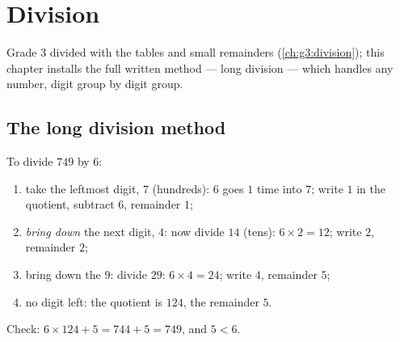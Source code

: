 \chapter{Division}\label{ch:g4:division}

Grade 3 divided with the tables and small remainders
(\cref{ch:g3:division}); this chapter installs the full written
method --- long division --- which handles any number, digit group by
digit group.

\section{The long division method}

\begin{method}\label{met:g4:division:method}
To divide $749$ by $6$:
\begin{enumerate}
  \item take the leftmost digit, $7$ (hundreds): $6$ goes $1$ time
        into $7$; write $1$ in the quotient, subtract
        $6$, remainder $1$;
  \item \emph{bring down} the next digit, $4$: now divide $14$
        (tens): $6 \times 2 = 12$; write $2$, remainder $2$;
  \item bring down the $9$: divide $29$: $6 \times 4 = 24$; write
        $4$, remainder $5$;
  \item no digit left: the quotient is $124$, the remainder $5$.
\end{enumerate}
Check: $6 \times 124 + 5 = 744 + 5 = 749$, and $5 < 6$.
\end{method}

